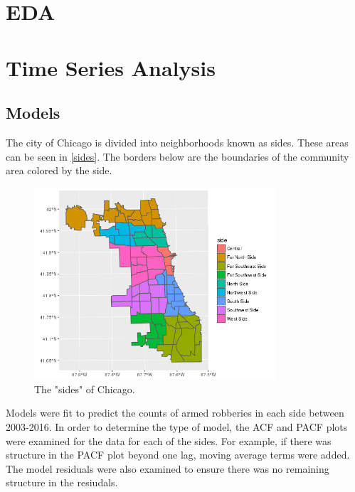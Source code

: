 \documentclass{article} %
\begin{document}
\section{EDA}

\section{Time Series Analysis}

\subsection{Models}

\noindent The city of Chicago is divided into neighborhoods known as sides. These areas can be seen in \autoref{sides}. The borders below are the boundaries of the community area colored by the side.  

\begin{figure}[h]
\begin{center}

\includegraphics[width=0.8\textwidth,keepaspectratio]{CopyOfside.png}
\caption{The "sides" of Chicago.}
\label{sides}
\end{center}
\end{figure}

\noindent Models were fit to predict the counts of armed robberies in each side between 2003-2016. In order to determine the type of model, the ACF and PACF plots were examined for the data for each of the sides. For example, if there was structure in the PACF plot beyond one lag, moving average terms were added. The model residuals were also examined to ensure there was no remaining structure in the resiudals. 
\end{document}

